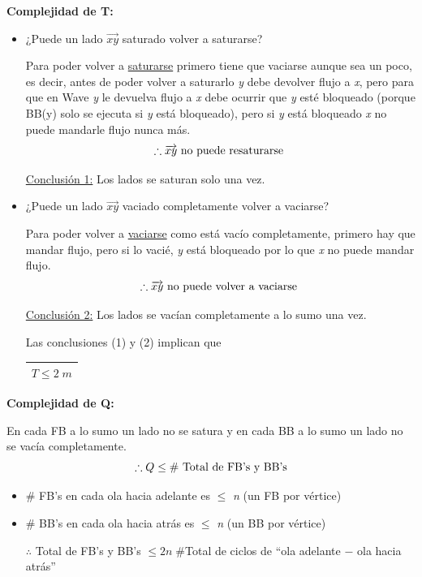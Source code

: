 \documentclass[12pt,a4paper]{report}
\begin{document}
  			\pagebreak
  			\textbf{Complejidad de T:}
  			\begin{itemize}
  				\item ¿Puede un lado $\overrightarrow{xy}$ saturado volver a saturarse?
  					\par Para poder volver a \underline{saturarse} primero tiene que vaciarse aunque sea un poco, es decir, antes de poder volver a saturarlo \textit{y} debe devolver flujo a \textit{x}, pero para que en Wave \textit{y} le devuelva flujo a \textit{x} debe ocurrir que \textit{y} esté bloqueado (porque BB(y) solo se ejecuta si \textit{y} está bloqueado), pero si \textit{y} está bloqueado \textit{x} no puede mandarle flujo nunca más.
  					\[ \therefore \overrightarrow{xy} \textup{ no puede resaturarse } \]
  					\par \underline{Conclusión 1:} Los lados se saturan solo una vez.
  				\item ¿Puede un lado $\overrightarrow{xy}$ vaciado completamente volver a vaciarse?
  					\par Para poder volver a \underline{vaciarse} como está vacío completamente, primero hay que mandar flujo, pero si lo vacié, \textit{y} está bloqueado por lo que \textit{x} no puede mandar flujo.
  					\[ \therefore \overrightarrow{xy} \textup{ no puede volver a vaciarse } \]
  					\par \underline{Conclusión 2:} Los lados se vacían completamente a lo sumo una vez.

  				\par Las conclusiones (1) y (2) implican que \begin{tabular}{|c|} \hline $T \leq 2 \; m$ \\\hline \end{tabular}
  			\end{itemize}

  			\textbf{Complejidad de Q:}
  				\vspace{3mm}
  				\par En cada FB a lo sumo un lado no se satura y en cada BB a lo sumo un lado no se vacía completamente.
  				\[ \therefore Q \leq \# \textup{ Total de FB's y BB's} \]
  				\begin{itemize}
  					\item \# FB's en cada ola hacia adelante es $\leq$ \textit{n} (un FB por vértice)
  					\item \# BB's en cada ola hacia atrás es $\leq$ \textit{n} (un BB por vértice)

  					\vspace{5mm}
  					\par $\therefore$ Total de FB's y BB's $\leq 2 n \; \#$Total de ciclos de \textquotedblleft ola adelante $-$ ola hacia atrás\textquotedblright
  	 			\end{itemize}
\end{document}
